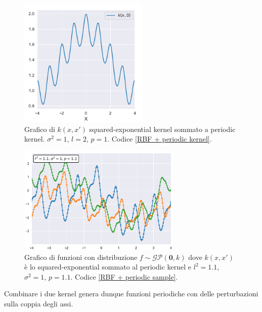\begin{figure}[h]
    \centering
    \includegraphics[width=0.55\textwidth]{images/Gaussian process/RBF + periodic kernel.pdf}
    \caption{Grafico di $k(x,x')$ squared-exponential kernel sommato a periodic kernel. $\sigma^2=1$, $l=2$, $p=1$. Codice \ref{RBF + periodic kernel}.}
    \label{SE + periodic kernel}
\end{figure}



\begin{figure}[h]
    \centering    \includegraphics[width=0.69\textwidth]{images/Gaussian process/RBF + periodic sample.pdf}
    \caption{Grafico di funzioni con distribuzione  $f\sim \mathcal{GP}(\bm{0},k)$ dove $k(x,x')$ è lo squared-exponential sommato al periodic kernel e $l^2=1.1$, $\sigma^2=1$, $p=1.1$. Codice \ref{RBF + periodic sample}.}
    \label{SE + periodic sample}
\end{figure}

Combinare i due kernel genera dunque funzioni periodiche con delle perturbazioni sulla coppia degli assi.

\newpage


